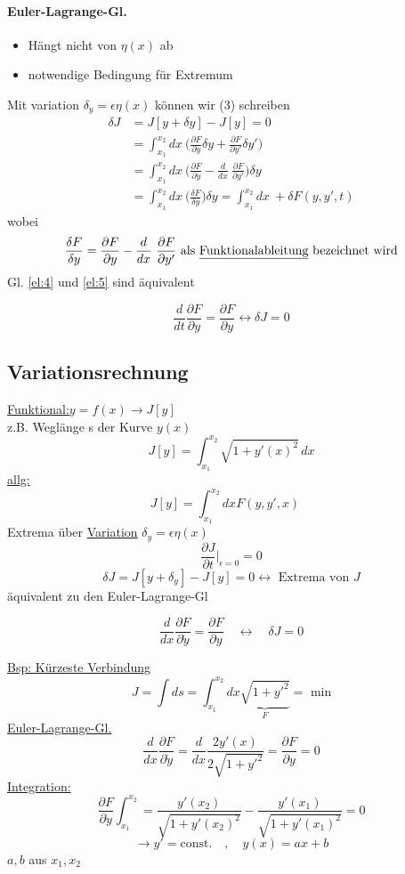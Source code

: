 \documentclass[titlepage,12pt,a4paper,ngerman]{report}
\newcommand{\tx}[1]{\textrm{#1}}
\newcommand{\ub}[1]{\underbrace{#1}}
\newcommand{\const}{\tx{const.}}
\newcommand{\frbox}[2]{\begin{tcolorbox}[colback=white,colframe=red!75!black,fonttitle=\bfseries,title=#1]#2\end{tcolorbox}} %
\begin{document}
\paragraph{Euler-Lagrange-Gl.}
\begin{itemize}
	\item Hängt nicht von $\eta(x)$ ab
	\item notwendige Bedingung für Extremum
\end{itemize}
Mit variation $\delta_y = \epsilon \eta(x)$ können wir (3) schreiben
\begin{align}\label{el:5}
\delta J &= J[y + \delta y] - J[y] = 0 \tag*{(5)}\\
&= \int_{x_1}^{x_2} dx\ \bigg(\frac{\partial F}{\partial y} \delta y + \frac{\partial F}{\partial y'} \delta y'\bigg) \nonumber\\
&= \int_{x_1}^{x_2} dx\ \bigg(\frac{\partial F}{\partial y} - \frac{d}{dx}\ \frac{\partial F}{\partial y'}\bigg)\delta y \nonumber\\
&= \int_{x_1}^{x_2} dx\ \bigg(\frac{\delta F}{\delta y}\bigg)\delta y = \int_{x_1}^{x_2} dx\ + \delta F(y,y',t) \nonumber
\end{align}
wobei $$\frac{\delta F}{\delta y} = \frac{\partial F}{\partial y} - \frac{d}{dx}\ \frac{\partial F}{\partial y'} \tx{ als \underline{Funktionalableitung} bezeichnet wird}$$
Gl. \ref{el:4} und \ref{el:5} sind äquivalent
\frbox{\tx{,,}Variationsprinzip\tx{``}}{$$\frac{d}{dt}\frac{\partial F}{\partial y} = \frac{\partial F}{\partial y} \leftrightarrow \delta J = 0$$}


\subsection{Variationsrechnung}
\underline{Funktional:}$ y=f(x) \rightarrow J[y] $\\
z.B. Weglänge s der Kurve $ y(x) $
$$J[y] = \int_{x_1}^{x_2} \sqrt{1+y'(x)^2} \, dx$$
\underline{allg:} $$ J[y] = \int_{x_1}^{x_2} dx F(y,y',x) \quad $$
Extrema über \underline{Variation} $ \delta_y = \epsilon \eta (x) $
$$ \frac{\partial J}{\partial t} \bigg|_{\epsilon=0} = 0$$
$$ \delta J = J[y+\delta_y] - J[y] = 0 \leftrightarrow \tx{ Extrema von } J$$
äquivalent zu den Euler-Lagrange-Gl
\frbox{Extremalbedingungen}{$$\frac{d}{dx} \frac{\partial F}{\partial \dot{y}} = \frac{\partial F}{\partial y} \quad \leftrightarrow \quad \delta J = 0 $$}
\underline{Bsp: Kürzeste Verbindung}
$$J = \int ds = \int_{x_1}^{x_2} dx \ub{\sqrt{1 + y'^2}}_{F} = \tx{ min} $$
\underline{Euler-Lagrange-Gl.}
$$\frac{d}{dx} \frac{\partial F}{\partial \dot{y}} = \frac{d}{dx} \frac{2 y'(x)}{2 \sqrt{1 + y'^2}} = \frac{\partial F}{\partial y} = 0 $$
\underline{Integration:}$$\frac{\partial F}{\partial \dot{y}} \int_{x_1}^{x_2} = \frac{y'(x_2)}{\sqrt{1+y'(x_2)^2}} - \frac{y'(x_1)}{\sqrt{1+y'(x_1)^2}} =0 $$
$$\rightarrow y' = \const \quad , \quad y(x)= ax+b$$
$a,b$ aus $ x_1,x_2 $
\end{document}
